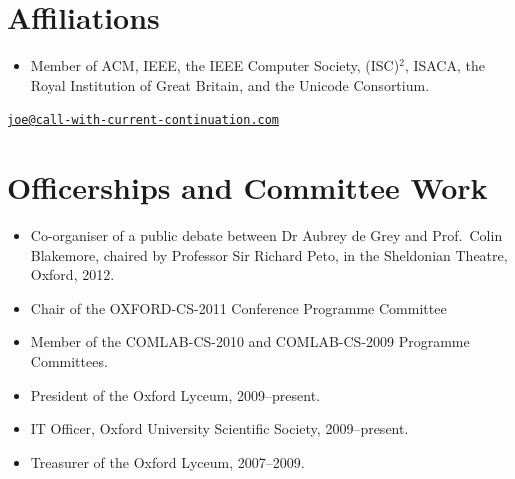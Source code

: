 \documentclass[12pt,twoside,letterpaper]{article}
\begin{document}
\vspace{-8mm}
\section*{Affiliations}
\vspace{-2mm}
\begin{itemize}
    \item Member of ACM, IEEE, the IEEE Computer Society, (ISC)$^2$, ISACA,
        the Royal Institution of Great Britain, and the Unicode Consortium.
\end{itemize}


\newpage


\vspace*{-18mm}\hfill\href{mailto:joe@call-with-current-continuation.com}%
{\nolinkurl{joe@call-with-current-continuation.com}}

\vspace{-3mm}
\section*{Officerships and Committee Work}
\vspace{-2mm}
\begin{itemize}
	\item Co-organiser of a public debate between Dr Aubrey de Grey
		and Prof.\ Colin Blakemore, chaired by Professor Sir Richard
		Peto, in the Sheldonian Theatre, Oxford, 2012.
	\item Chair of the OXFORD-CS-2011 Conference Programme Committee
	\item Member of the COMLAB-CS-2010 and COMLAB-CS-2009 Programme
		Committees.
	\item President of the Oxford Lyceum, 2009--present.
	\item IT Officer, Oxford University Scientific Society, 2009--present.
	\item Treasurer of the Oxford Lyceum, 2007--2009.
\end{itemize}


\vspace{-8mm}
\end{document}

